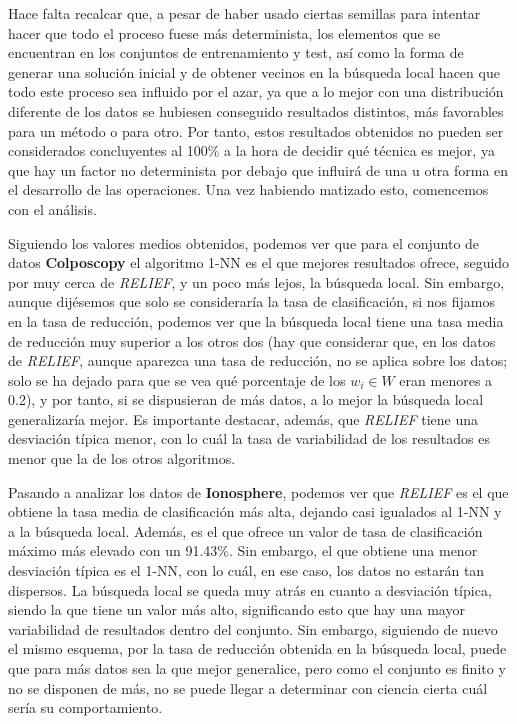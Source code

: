 \documentclass[11pt,a4paper]{article}
\begin{document}
Hace falta recalcar que, a pesar de haber usado ciertas semillas para intentar hacer que todo el proceso fuese más
determinista, los elementos que se encuentran en los conjuntos de entrenamiento y test, así como la forma de generar una
solución inicial y de obtener vecinos en la búsqueda local hacen que todo este proceso sea influido por el azar, ya que a lo
mejor con una distribución diferente de los datos se hubiesen conseguido resultados distintos, más favorables para un
método o para otro. Por tanto, estos resultados obtenidos no pueden ser considerados concluyentes al 100\% a la hora de
decidir qué técnica es mejor, ya que hay un factor no determinista por debajo que influirá de una u otra forma en el
desarrollo de las operaciones. Una vez habiendo matizado esto, comencemos con el análisis.

Siguiendo los valores medios obtenidos, podemos ver que para el conjunto de datos \textbf{Colposcopy} el algoritmo 1-NN es
el que mejores resultados ofrece, seguido por muy cerca de \textit{RELIEF}, y un poco más lejos, la búsqueda local. Sin
embargo, aunque dijésemos que solo se consideraría la tasa de clasificación, si nos fijamos en la tasa de reducción, podemos
ver que la búsqueda local tiene una tasa media de reducción muy superior a los otros dos (hay que considerar que, en los
datos de \textit{RELIEF}, aunque aparezca una tasa de reducción, no se aplica sobre los datos; solo se ha dejado para que
se vea qué porcentaje de los $w_i \in W$ eran menores a 0.2), y por tanto, si se dispusieran de más datos, a lo mejor la 
búsqueda local generalizaría mejor. Es importante destacar, además, que \textit{RELIEF} tiene una desviación típica menor,
con lo cuál la tasa de variabilidad de los resultados es menor que la de los otros algoritmos.

Pasando a analizar los datos de \textbf{Ionosphere}, podemos ver que \textit{RELIEF} es el que obtiene la tasa media de
clasificación más alta, dejando casi igualados al 1-NN y a la búsqueda local. Además, es el que ofrece un valor de tasa
de clasificación máximo más elevado con un 91.43\%. Sin embargo, el que obtiene una menor desviación típica es el 1-NN, con
lo cuál, en ese caso, los datos no estarán tan dispersos. La búsqueda local se queda muy atrás en cuanto a desviación típica,
siendo la que tiene un valor más alto, significando esto que hay una mayor variabilidad de resultados dentro del conjunto.
Sin embargo, siguiendo de nuevo el mismo esquema, por la tasa de reducción obtenida en la búsqueda local, puede que para
más datos sea la que mejor generalice, pero como el conjunto es finito y no se disponen de más, no se puede llegar a
determinar con ciencia cierta cuál sería su comportamiento.
\end{document}
